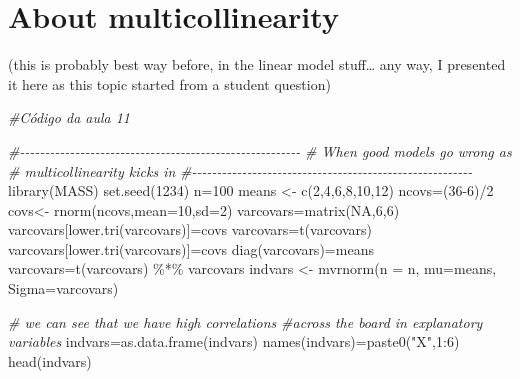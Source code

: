 \documentclass[
]{book}
\newenvironment{Shaded}{\begin{snugshade}}{\end{snugshade}}
\newcommand{\AttributeTok}[1]{\textcolor[rgb]{0.77,0.63,0.00}{#1}}
\newcommand{\CommentTok}[1]{\textcolor[rgb]{0.56,0.35,0.01}{\textit{#1}}}
\newcommand{\ConstantTok}[1]{\textcolor[rgb]{0.00,0.00,0.00}{#1}}
\newcommand{\DecValTok}[1]{\textcolor[rgb]{0.00,0.00,0.81}{#1}}
\newcommand{\FunctionTok}[1]{\textcolor[rgb]{0.00,0.00,0.00}{#1}}
\newcommand{\NormalTok}[1]{#1}
\newcommand{\OtherTok}[1]{\textcolor[rgb]{0.56,0.35,0.01}{#1}}
\newcommand{\SpecialCharTok}[1]{\textcolor[rgb]{0.00,0.00,0.00}{#1}}
\newcommand{\StringTok}[1]{\textcolor[rgb]{0.31,0.60,0.02}{#1}}
\begin{document}
\hypertarget{about-multicollinearity}{%
\section{About multicollinearity}\label{about-multicollinearity}}

(this is probably best way before, in the linear model stuff\ldots{} any way, I presented it here as this topic started from a student question)

\begin{Shaded}
\begin{Highlighting}[]
\CommentTok{\#Código da aula 11}

\CommentTok{\#{-}{-}{-}{-}{-}{-}{-}{-}{-}{-}{-}{-}{-}{-}{-}{-}{-}{-}{-}{-}{-}{-}{-}{-}{-}{-}{-}{-}{-}{-}{-}{-}{-}{-}{-}{-}{-}{-}{-}{-}{-}{-}{-}{-}{-}{-}{-}{-}{-}{-}{-}{-}{-}{-}{-}{-}}
\CommentTok{\# When good models go wrong as }
\CommentTok{\# multicollinearity kicks in}
\CommentTok{\#{-}{-}{-}{-}{-}{-}{-}{-}{-}{-}{-}{-}{-}{-}{-}{-}{-}{-}{-}{-}{-}{-}{-}{-}{-}{-}{-}{-}{-}{-}{-}{-}{-}{-}{-}{-}{-}{-}{-}{-}{-}{-}{-}{-}{-}{-}{-}{-}{-}{-}{-}{-}{-}{-}{-}{-}}
\FunctionTok{library}\NormalTok{(MASS)}
\FunctionTok{set.seed}\NormalTok{(}\DecValTok{1234}\NormalTok{)}
\NormalTok{n}\OtherTok{=}\DecValTok{100}
\NormalTok{means }\OtherTok{\textless{}{-}} \FunctionTok{c}\NormalTok{(}\DecValTok{2}\NormalTok{,}\DecValTok{4}\NormalTok{,}\DecValTok{6}\NormalTok{,}\DecValTok{8}\NormalTok{,}\DecValTok{10}\NormalTok{,}\DecValTok{12}\NormalTok{)}
\NormalTok{ncovs}\OtherTok{=}\NormalTok{(}\DecValTok{36{-}6}\NormalTok{)}\SpecialCharTok{/}\DecValTok{2}
\NormalTok{covs}\OtherTok{\textless{}{-}} \FunctionTok{rnorm}\NormalTok{(ncovs,}\AttributeTok{mean=}\DecValTok{10}\NormalTok{,}\AttributeTok{sd=}\DecValTok{2}\NormalTok{)}
\NormalTok{varcovars}\OtherTok{=}\FunctionTok{matrix}\NormalTok{(}\ConstantTok{NA}\NormalTok{,}\DecValTok{6}\NormalTok{,}\DecValTok{6}\NormalTok{)}
\NormalTok{varcovars[}\FunctionTok{lower.tri}\NormalTok{(varcovars)]}\OtherTok{=}\NormalTok{covs}
\NormalTok{varcovars}\OtherTok{=}\FunctionTok{t}\NormalTok{(varcovars)}
\NormalTok{varcovars[}\FunctionTok{lower.tri}\NormalTok{(varcovars)]}\OtherTok{=}\NormalTok{covs}
\FunctionTok{diag}\NormalTok{(varcovars)}\OtherTok{=}\NormalTok{means}
\NormalTok{varcovars}\OtherTok{=}\FunctionTok{t}\NormalTok{(varcovars) }\SpecialCharTok{\%*\%}\NormalTok{ varcovars}
\NormalTok{indvars }\OtherTok{\textless{}{-}} \FunctionTok{mvrnorm}\NormalTok{(}\AttributeTok{n =}\NormalTok{ n, }\AttributeTok{mu=}\NormalTok{means, }\AttributeTok{Sigma=}\NormalTok{varcovars)}

\CommentTok{\# we can see that we have high correlations }
\CommentTok{\#across the board in explanatory variables}
\NormalTok{indvars}\OtherTok{=}\FunctionTok{as.data.frame}\NormalTok{(indvars)}
\FunctionTok{names}\NormalTok{(indvars)}\OtherTok{=}\FunctionTok{paste0}\NormalTok{(}\StringTok{"X"}\NormalTok{,}\DecValTok{1}\SpecialCharTok{:}\DecValTok{6}\NormalTok{)}
\FunctionTok{head}\NormalTok{(indvars)}
\end{Highlighting}
\end{Shaded}
\end{document}
